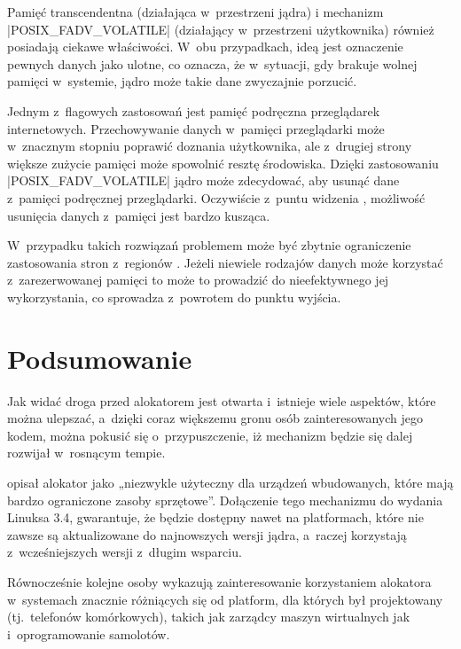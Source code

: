 Pamięć transcendentna \autocite{bib:transcendent} (działająca
w~przestrzeni jądra) i mechanizm \code|POSIX_FADV_VOLATILE|
\autocite{bib:fadv-volatile} (działający w~przestrzeni użytkownika)
również posiadają ciekawe właściwości.  W~obu przypadkach, ideą jest
oznaczenie pewnych danych jako ulotne, co oznacza, że w~sytuacji, gdy
brakuje wolnej pamięci w~systemie, jądro może takie dane zwyczajnie
porzucić.

Jednym z~flagowych zastosowań jest pamięć podręczna przeglądarek
internetowych.  Przechowywanie danych w~pamięci przeglądarki może
w~znacznym stopniu poprawić doznania użytkownika, ale z~drugiej strony
większe zużycie pamięci może spowolnić resztę środowiska.  Dzięki
zastosowaniu \code|POSIX_FADV_VOLATILE| jądro może zdecydować, aby
usunąć dane z~pamięci podręcznej przeglądarki.  Oczywiście z~puntu
widzenia , możliwość usunięcia danych z~pamięci jest bardzo
kusząca.

W~przypadku takich rozwiązań problemem może być zbytnie ograniczenie
zastosowania stron z~regionów .  Jeżeli niewiele rodzajów danych
może korzystać z~zarezerwowanej pamięci to może to prowadzić do
nieefektywnego jej wykorzystania, co sprowadza  z~powrotem do
punktu wyjścia.

\section{Podsumowanie}

Jak widać droga przed alokatorem  jest otwarta i~istnieje
wiele aspektów, które można ulepszać, a~dzięki coraz większemu gronu
osób zainteresowanych jego kodem, można pokusić się o~przypuszczenie,
iż mechanizm  będzie się dalej rozwijał w~rosnącym tempie.

\textcite{bib:ltsi-34} opisał alokator  jako „niezwykle
użyteczny dla urządzeń wbudowanych, które mają bardzo ograniczone
zasoby sprzętowe”.  Dołączenie tego mechanizmu do wydania 
Linuksa 3.4, gwarantuje, że będzie dostępny nawet na platformach,
które nie zawsze są aktualizowane do najnowszych wersji jądra,
a~raczej korzystają z~wcześniejszych wersji z~długim wsparciu.

Równocześnie kolejne osoby wykazują zainteresowanie korzystaniem
alokatora  w~systemach znacznie różniących się od platform,
dla których był projektowany (tj.\ telefonów komórkowych), takich jak
zarządcy maszyn wirtualnych jak i~oprogramowanie samolotów.
